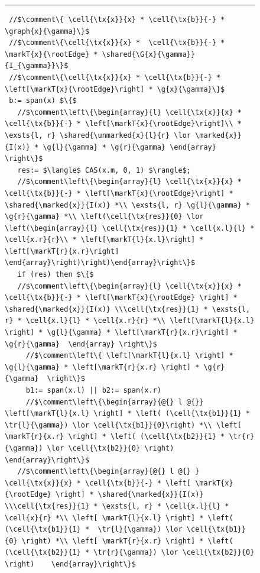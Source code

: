 \begin{figure}
\hrule
\begin{lstlisting}
 //$\comment\{ \cell{\tx{x}}{x} * \cell{\tx{b}}{-} * \graph{x}{\gamma}\}$
 //$\comment\{\cell{\tx{x}}{x} *  \cell{\tx{b}}{-} * \markT{x}{\rootEdge} * \shared{\G{x}{\gamma}}{I_{\gamma}}\}$
 //$\comment\{\cell{\tx{x}}{x} * \cell{\tx{b}}{-} * \left[\markT{x}{\rootEdge}\right] * \g{x}{\gamma}\}$
 b:= span(x) $\{$
   //$\comment\left\{\begin{array}{l} \cell{\tx{x}}{x} * \cell{\tx{b}}{-} * \left[\markT{x}{\rootEdge}\right]\\ * \exsts{l, r} \shared{\unmarked{x}{l}{r} \lor \marked{x}}{I(x)} * \g{l}{\gamma} * \g{r}{\gamma} \end{array} \right\}$
   res:= $\langle$ CAS(x.m, 0, 1) $\rangle$;
   //$\comment\left\{\begin{array}{l} \cell{\tx{x}}{x} * \cell{\tx{b}}{-} * \left[\markT{x}{\rootEdge}\right] * \shared{\marked{x}}{I(x)} *\\ \exsts{l, r} \g{l}{\gamma} * \g{r}{\gamma} *\\ \left(\cell{\tx{res}}{0} \lor  \left(\begin{array}{l} \cell{\tx{res}}{1} * \cell{x.l}{l} * \cell{x.r}{r}\\ * \left[\markT{l}{x.l}\right] * \left[\markT{r}{x.r}\right] \end{array}\right)\right)\end{array}\right\}$
   if (res) then $\{$ 
   //$\comment\left\{\begin{array}{l} \cell{\tx{x}}{x} * \cell{\tx{b}}{-} * \left[\markT{x}{\rootEdge} \right] * \shared{\marked{x}}{I(x)} \\\cell{\tx{res}}{1} * \exsts{l, r} * \cell{x.l}{l} * \cell{x.r}{r} *\\ \left[\markT{l}{x.l} \right] * \g{l}{\gamma} * \left[\markT{r}{x.r}\right] * \g{r}{\gamma}  \end{array} \right\}$
     //$\comment\left\{ \left[\markT{l}{x.l} \right] * \g{l}{\gamma} * \left[\markT{r}{x.r} \right] * \g{r}{\gamma}  \right\}$   
     b1:= span(x.l) || b2:= span(x.r)
     //$\comment\left\{\begin{array}{@{} l @{}}  \left[\markT{l}{x.l} \right] * \left( (\cell{\tx{b1}}{1} *  \tr{l}{\gamma}) \lor \cell{\tx{b1}}{0}\right) *\\ \left[ \markT{r}{x.r} \right] * \left( (\cell{\tx{b2}}{1} * \tr{r}{\gamma}) \lor \cell{\tx{b2}}{0} \right)  \end{array}\right\}$   
   //$\comment\left\{\begin{array}{@{} l @{} }  \cell{\tx{x}}{x} * \cell{\tx{b}}{-} * \left[ \markT{x}{\rootEdge} \right] * \shared{\marked{x}}{I(x)} \\\cell{\tx{res}}{1} * \exsts{l, r} * \cell{x.l}{l} * \cell{x}{r} *\\ \left[ \markT{l}{x.l} \right] * \left( (\cell{\tx{b1}}{1} *  \tr{l}{\gamma}) \lor \cell{\tx{b1}}{0} \right) *\\ \left[ \markT{r}{x.r} \right] * \left( (\cell{\tx{b2}}{1} * \tr{r}{\gamma}) \lor \cell{\tx{b2}}{0} \right)    \end{array}\right\}$  

\end{lstlisting}
\end{figure}

